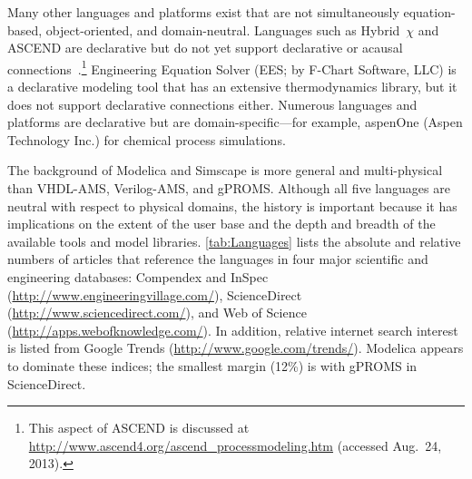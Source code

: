 Many other languages and platforms exist that are not simultaneously equation-based, object-oriented, and domain-neutral.  Languages such as Hybrid~$\chi$ and ASCEND are declarative but do not yet support declarative or acausal connections~\cite{Broman2010}.\footnote{This aspect of ASCEND is discussed at \url{http://www.ascend4.org/ascend_processmodeling.htm} (accessed Aug.\ 24, 2013).}  Engineering Equation Solver (EES; by F-Chart Software, LLC) is a declarative modeling tool that has an extensive thermodynamics library, but it does not support declarative connections either.  Numerous languages and platforms are declarative but are domain-specific---for example, aspenOne (Aspen Technology Inc.) for chemical process simulations.

The background of Modelica and Simscape is more general and multi-physical than VHDL-AMS, Verilog-AMS, and gPROMS\@.  Although all five languages are neutral with respect to physical domains, the history is important because it has implications on the extent of the user base and the depth and breadth of the available tools and model libraries.  \autoref{tab:Languages} lists the absolute and relative numbers of articles that reference the languages in four major scientific and engineering databases: Compendex and InSpec (\url{http://www.engineeringvillage.com/}), ScienceDirect (\url{http://www.sciencedirect.com/}), and Web of Science (\url{http://apps.webofknowledge.com/}).  In addition, relative internet search interest is listed from Google Trends (\url{http://www.google.com/trends/}).  Modelica appears to dominate these indices; the smallest margin (12\%) is with gPROMS in ScienceDirect.

